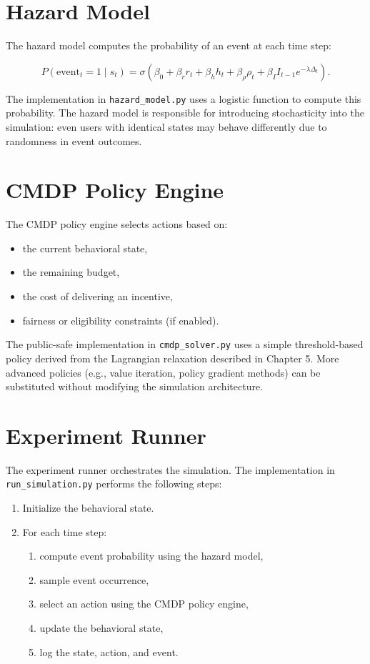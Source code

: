 \section{Hazard Model}

The hazard model computes the probability of an event at each time step:


\[
P(\text{event}_t = 1 \mid s_t) =
\sigma\left(
\beta_0
+ \beta_r r_t
+ \beta_h h_t
+ \beta_\rho \rho_t
+ \beta_I I_{t-1} e^{-\lambda \Delta_t}
\right).
\]



The implementation in \texttt{hazard\_model.py} uses a logistic function to
compute this probability. The hazard model is responsible for introducing
stochasticity into the simulation: even users with identical states may behave
differently due to randomness in event outcomes.

\section{CMDP Policy Engine}

The CMDP policy engine selects actions based on:

\begin{itemize}
    \item the current behavioral state,
    \item the remaining budget,
    \item the cost of delivering an incentive,
    \item fairness or eligibility constraints (if enabled).
\end{itemize}

The public-safe implementation in \texttt{cmdp\_solver.py} uses a simple
threshold-based policy derived from the Lagrangian relaxation described in
Chapter 5. More advanced policies (e.g., value iteration, policy gradient
methods) can be substituted without modifying the simulation architecture.

\section{Experiment Runner}

The experiment runner orchestrates the simulation. The implementation in
\texttt{run\_simulation.py} performs the following steps:

\begin{enumerate}
    \item Initialize the behavioral state.
    \item For each time step:
    \begin{enumerate}
        \item compute event probability using the hazard model,
        \item sample event occurrence,
        \item select an action using the CMDP policy engine,
        \item update the behavioral state,
        \item log the state, action, and event.
    \end{enumerate}
\end{enumerate}

